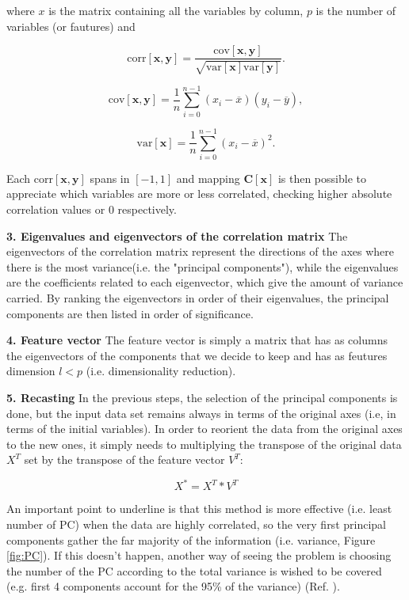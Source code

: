 \documentclass[english,notitlepage,reprint,nofootinbib]{revtex4-1}  %
\begin{document}
where $x$ is the matrix containing all the variables by column, $p$ is the number of variables (or fautures) and 

$$
\mathrm{corr}[\boldsymbol{x},\boldsymbol{y}]=\frac{\mathrm{cov}[\boldsymbol{x},\boldsymbol{y}]}{\sqrt{\mathrm{var}[\boldsymbol{x}] \mathrm{var}[\boldsymbol{y}]}}.
$$

$$
\mathrm{cov}[\boldsymbol{x},\boldsymbol{y}] =\frac{1}{n} \sum_{i=0}^{n-1}(x_i- \overline{x})(y_i- \overline{y}),
$$

$$
\mathrm{var}[\boldsymbol{x}]=\frac{1}{n} \sum_{i=0}^{n-1}(x_i- \overline{x})^2.
$$

Each $\mathrm{corr}[\boldsymbol{x},\boldsymbol{y}]$ spans in $[-1,1]$ and mapping $\boldsymbol{C}[\boldsymbol{x}]$ is then possible to appreciate which variables are more or less correlated, checking higher absolute correlation values or 0 respectively.

\textbf{3. Eigenvalues and eigenvectors of the correlation matrix}
The eigenvectors of the correlation matrix represent the directions of the axes where there is the most variance(i.e. the "principal components"), while the eigenvalues are the coefficients related to each eigenvector, which give the amount of variance carried. By ranking the eigenvectors in order of their eigenvalues, the principal components are then listed in order of significance.

\textbf{4. Feature vector}
The feature vector is simply a matrix that has as columns the eigenvectors of the components that we decide to keep and has as feutures dimension $l < p$ (i.e. dimensionality reduction).

\textbf{5. Recasting}
In the previous steps, the selection of the principal components is done, but the input data set remains always in terms of the original axes (i.e, in terms of the initial variables). In order to reorient the data from the original axes to the new ones, it simply needs to multiplying the transpose of the original data $X^{T}$ set by the transpose of the feature vector $V^{T}$:

\begin{equation}
    X^{*} = X^{T} * V^{T}
\end{equation}

An important point to underline is that this method is more effective (i.e. least number of PC) when the data are highly correlated, so the very first principal components gather the far majority of the information (i.e. variance, Figure \ref{fig:PC}). If this doesn't happen, another way of seeing the problem is choosing the number of the PC according to the total variance is wished to be covered (e.g. first 4 components account for the 95\% of the variance) (Ref. \cite{pc2}).
\end{document}
